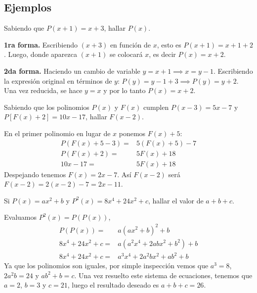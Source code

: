 \subsection{Ejemplos}

\begin{example}
    Sabiendo que $P(x + 1) = x + 3$, hallar $P(x)$.
\end{example}
\begin{solution}
    \textbf{1ra forma.} Escribiendo $(x + 3)$ en función de $x$, esto es $P(x + 1) = x + 1 + 2$.
    Luego, donde aparezca $(x + 1)$ se colocará $x$, es decir $P(x) = x + 2$.

    \textbf{2da forma.} Haciendo un cambio de variable $y = x + 1 \implies x = y - 1$.
    Escribiendo la expresión original en términos de $y$: $P(y) = y - 1 + 3 \implies P(y) = y + 2$.
    Una vez reducida, se hace $y = x$ y por lo tanto $P(x) = x + 2$.
\end{solution}

\begin{example}
    Sabiendo que los polinomios $P(x)$ y $F(x)$ cumplen $P(x - 3) = 5x - 7$ y $P[F(x) + 2] = 10x - 17$, hallar $F(x - 2)$.
\end{example}
\begin{solution}
    En el primer polinomio en lugar de $x$ ponemos $F(x) + 5$:
    \begin{align*}
        P(F(x) + 5 - 3) =&  5 (F(x) + 5) - 7\\
        P(F(x) + 2) =& 5F(x) + 18\\
        10x - 17 =& 5F(x) + 18
    \end{align*}
    Despejando tenemos $F(x) = 2x - 7$.
    Así $F(x - 2)$ será $F(x - 2) = 2(x - 2) - 7 = \boxed{2x - 11}$.
\end{solution}

\begin{example}
    Si $P(x) = ax^2 + b$ y $P^2(x) = 8x^4 + 24x^2 + c$, hallar el valor de $a + b + c$.
\end{example}
\begin{solution}
    Evaluamos $P^2(x) = P(P(x))$,
    \begin{align*}
        P(P(x)) =& a (ax^2 + b)^2 + b\\
        8x^4 + 24x^2 + c =& a (a^2 x^4 + 2abx^2 + b^2) + b\\
        8x^4 + 24x^2 + c =& a^3 x^4 + 2a^2 bx^2 + ab^2 + b
    \end{align*}
    Ya que los polinomios son iguales, por simple inspección vemos que $a^3 = 8$, $2a^2 b = 24$ y $ab^2 + b = c$.
    Una vez resuelto este sistema de ecuaciones, tenemos que $a = 2$, $b = 3$ y $c = 21$, luego el resultado deseado es $a + b + c = 26$.
\end{solution}

